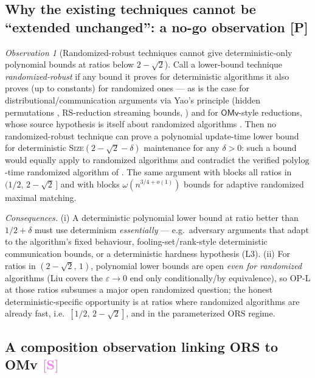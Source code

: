 \documentclass[11pt]{article}
\theoremstyle{definition}
\theoremstyle{remark}
\newtheorem{observation}[theorem]{Observation}
\newcommand{\statusP}{\textcolor{blue!60!black}{\textsf{[P]}}}
\newcommand{\statusS}{\textcolor{violet}{\textsf{[S]}}}
\newcommand{\ORS}{\mathrm{ORS}}
\newcommand{\polylog}{\mathrm{polylog}}
\newcommand{\OMv}{\mathsf{OMv}}
\newcommand{\eps}{\varepsilon}
\begin{document}
\subsection{Why the existing techniques cannot be ``extended unchanged'':
a no-go observation \statusP}

\begin{observation}[Randomized-robust techniques cannot give
deterministic-only polynomial bounds at ratios below $2-\sqrt2$]
\label{obs:nogo}
Call a lower-bound technique \emph{randomized-robust} if any bound it
proves for deterministic algorithms it also proves (up to constants) for
randomized ones --- as is the case for distributional/communication
arguments via Yao's principle (hidden permutations \cite{AS23},
RS-reduction streaming bounds, \cite{BRR24}) and for $\OMv$-style
reductions, whose source hypothesis is itself about randomized
algorithms \cite{HKNS15}. Then no randomized-robust technique can prove
a polynomial update-time lower bound for deterministic
\textsc{Size}$(2-\sqrt2-\delta)$ maintenance for any $\delta>0$:
such a bound would equally apply to randomized algorithms and contradict
the verified $\polylog$-time randomized algorithm of \cite{ABR24}.
The same argument with \cite{BKSW23,Beh23} blocks all ratios in
$(1/2,\,2-\sqrt2\,]$ and with \cite{BBKS25} blocks
$\omega(n^{3/4+o(1)})$ bounds for adaptive randomized maximal matching.
\end{observation}

\noindent\emph{Consequences.} (i) A deterministic polynomial lower bound
at ratio better than $1/2+\delta$ must use determinism \emph{essentially}
--- e.g.\ adversary arguments that adapt to the algorithm's fixed
behaviour, fooling-set/rank-style deterministic communication bounds, or
a deterministic hardness hypothesis (L3). (ii) For ratios in
$(2-\sqrt2,\,1)$, polynomial lower bounds are open \emph{even for
randomized} algorithms (Liu \cite{Liu24} covers the $\eps\to0$ end only
conditionally/by equivalence), so OP-L at those ratios subsumes a major
open randomized question; the honest deterministic-specific opportunity
is at ratios where randomized algorithms are already fast, i.e.\
$[1/2,\,2-\sqrt2]$, and in the parameterized $\ORS$ regime.

\subsection{A composition observation linking ORS to OMv \statusS}
\end{document}
